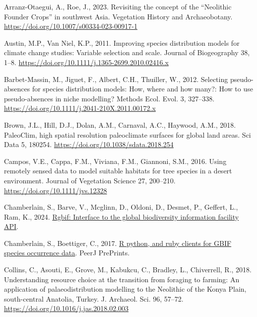 \documentclass[
  number,
  review]{elsarticle}
\newlength{\cslhangindent}
\newenvironment{CSLReferences}[2] %
 {\begin{list}{}{%
  \setlength{\itemindent}{0pt}
  \setlength{\leftmargin}{0pt}
  \setlength{\parsep}{0pt}
  \ifodd #1
   \setlength{\leftmargin}{\cslhangindent}
   \setlength{\itemindent}{-1\cslhangindent}
  \fi
  \setlength{\itemsep}{#2\baselineskip}}}
 {\end{list}}
\begin{document}
\label{refs}
\begin{CSLReferences}{1}{0}
Arranz-Otaegui, A., Roe, J., 2023. Revisiting the concept of the
{``{Neolithic Founder Crops}''} in southwest {Asia}. Vegetation History
and Archaeobotany. \url{https://doi.org/10.1007/s00334-023-00917-1}

Austin, M.P., Van Niel, K.P., 2011. Improving species distribution
models for climate change studies: Variable selection and scale. Journal
of Biogeography 38, 1--8.
\url{https://doi.org/10.1111/j.1365-2699.2010.02416.x}

Barbet-Massin, M., Jiguet, F., Albert, C.H., Thuiller, W., 2012.
Selecting pseudo-absences for species distribution models: How, where
and how many?: {How} to use pseudo-absences in niche modelling? Methods
Ecol. Evol. 3, 327--338.
\url{https://doi.org/10.1111/j.2041-210X.2011.00172.x}

Brown, J.L., Hill, D.J., Dolan, A.M., Carnaval, A.C., Haywood, A.M.,
2018. {PaleoClim}, high spatial resolution paleoclimate surfaces for
global land areas. Sci Data 5, 180254.
\url{https://doi.org/10.1038/sdata.2018.254}

Campos, V.E., Cappa, F.M., Viviana, F.M., Giannoni, S.M., 2016. Using
remotely sensed data to model suitable habitats for tree species in a
desert environment. Journal of Vegetation Science 27, 200--210.
\url{https://doi.org/10.1111/jvs.12328}

Chamberlain, S., Barve, V., Mcglinn, D., Oldoni, D., Desmet, P.,
Geffert, L., Ram, K., 2024.
\href{https://CRAN.R-project.org/package=rgbif}{Rgbif: Interface to the
global biodiversity information facility API}.

Chamberlain, S., Boettiger, C., 2017.
\href{https://doi.org/10.7287/peerj.preprints.3304v1}{R python, and ruby
clients for GBIF species occurrence data}. PeerJ PrePrints.

Collins, C., Asouti, E., Grove, M., Kabukcu, C., Bradley, L.,
Chiverrell, R., 2018. Understanding resource choice at the transition
from foraging to farming: {An} application of palaeodistribution
modelling to the {Neolithic} of the {Konya Plain}, south-central
{Anatolia}, {Turkey}. J. Archaeol. Sci. 96, 57--72.
\url{https://doi.org/10.1016/j.jas.2018.02.003}


\end{CSLReferences}
\end{document}
